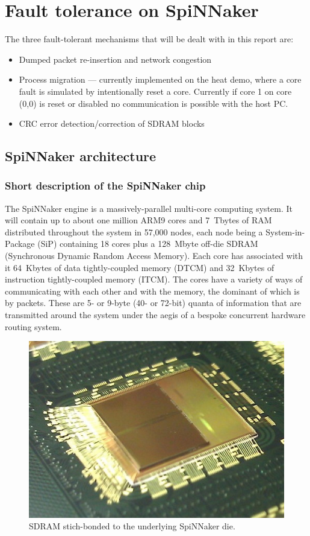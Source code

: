 \documentclass[a4paper, 11pt]{article}
\begin{document}
\section{Fault tolerance on SpiNNaker}
The three fault-tolerant mechanisms that will be dealt with in this report are:
\begin{itemize}
\item Dumped packet re-insertion and network congestion
\item Process migration --- currently implemented on the heat demo, where a core fault is simulated by intentionally reset a core. Currently if core 1 on core (0,0) is reset or disabled no communication is possible with the host PC.
\item CRC error detection/correction of SDRAM blocks
\end{itemize}

\subsection{SpiNNaker architecture}

\subsubsection{Short description of the SpiNNaker chip}
The SpiNNaker engine is a massively-parallel multi-core computing system. It will contain up to about one million ARM9 cores and 7~Tbytes of RAM distributed throughout the system in 57,000 nodes, each node being a System-in-Package (SiP) containing 18 cores plus a 128~Mbyte off-die SDRAM (Synchronous Dynamic Random Access Memory). Each core has associated with it 64~Kbytes of data tightly-coupled memory (DTCM) and 32~Kbytes of instruction tightly-coupled memory (ITCM). The cores have a variety of ways of communicating with each other and with the memory, the dominant of which is by packets. These are 5- or 9-byte (40- or 72-bit) quanta of information that are transmitted around the system under the aegis of a bespoke concurrent hardware routing system. 

\begin{figure}[htbp]
	\centering
	\includegraphics[width=0.25\linewidth]{images/spinnaker_die.jpg}
	\caption{SDRAM stich-bonded to the underlying SpiNNaker die.}
	\label{fig:spin5}
\end{figure}
\end{document}
